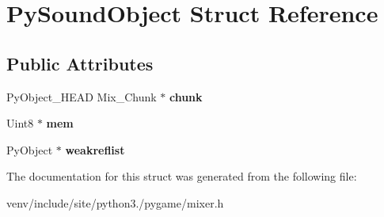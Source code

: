 \hypertarget{struct_py_sound_object}{}\section{Py\+Sound\+Object Struct Reference}
\label{struct_py_sound_object}
\subsection*{Public Attributes}
\begin{DoxyCompactItemize}
\item 
\mbox{\label{struct_py_sound_object_a286f1279ae224ad60bc4650e27831bfc}} 
Py\+Object\+\_\+\+H\+E\+AD Mix\+\_\+\+Chunk $\ast$ {\bfseries chunk}
\item 
\mbox{\label{struct_py_sound_object_a3ad0239827c4302b4da8ca00522cab5b}} 
Uint8 $\ast$ {\bfseries mem}
\item 
\mbox{\label{struct_py_sound_object_a412a524f0bfd4fcdcb71c2013b58a6fd}} 
Py\+Object $\ast$ {\bfseries weakreflist}
\end{DoxyCompactItemize}


The documentation for this struct was generated from the following file\+:\begin{DoxyCompactItemize}
\item 
venv/include/site/python3./pygame/mixer.\+h\end{DoxyCompactItemize}
